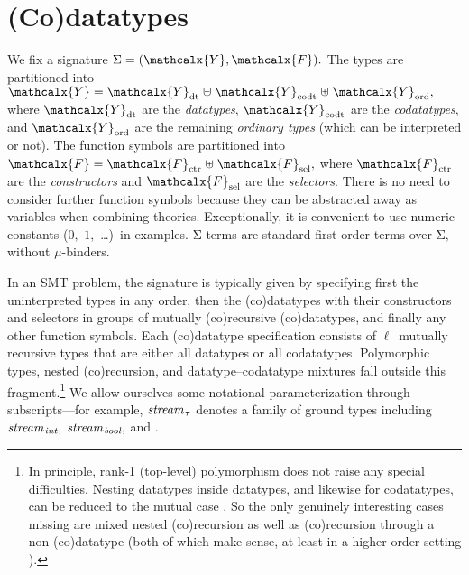 \documentclass[smallcondensed,draft]{svjour3}
\newcommand\Sig{\mathrm{\Sigma}}
\newcommand\ty[1]{\textit{#1}}
\newcommand\Types{\mathcalx{Y}}
\newcommand\Funcs{\mathcalx{F}}
\newcommand\Data{\Types_{\mathrm{dt}}}
\newcommand\Codata{\Types_{\mathrm{codt}}}
\newcommand\Nondata{\Types_{\mathrm{ord}}}
\newcommand\Ctr{\Funcs_{\smash{\mathrm{ctr}}}}
\newcommand\Sel{\Funcs_{\smash{\mathrm{sel}}}}
\newcommand\vthinspace{\kern+0.083333em}
\begin{document}
\section{%
(Co)datatypes}
\label{sec:co-datatypes}


We fix a signature $\Sig = (\Types, \Funcs).$ The types are partitioned into
$\Types = \Data \mathrel{\uplus} \Codata \mathrel{\uplus} \Nondata,$ where $\Data$ are the
\emph{datatypes}, $\Codata$ are the \emph{codatatypes}, and $\Nondata$ are the remaining
\emph{ordinary types} (which can be interpreted or not). The function symbols are
partitioned into $\Funcs = \Ctr \mathrel{\uplus} \Sel,$ where $\Ctr$ are the
\emph{constructors} and $\Sel$ are the \emph{selectors}. There is no need to
consider further function symbols because they can be abstracted away as
variables when combining theories.
Exceptionally, it is convenient to use numeric constants ($0,$ $1,$ \ldots)\ in
examples.
$\Sig$-terms are standard first-order terms
over $\Sig,$
without $\mu$-binders.

In an SMT problem, the signature is typically given by specifying first the
uninterpreted %
types in any order, then the (co)datatypes with their constructors
and selectors in groups of mutually (co)recursive (co)datatypes, and
finally any other function symbols.
%
Each (co)datatype specification consists of $\ell$~mutually recursive types that are
either all datatypes or all codatatypes. Polymorphic types, nested
(co)recursion, and datatype--codatatype mixtures
fall outside this fragment.\footnote{In principle, rank-1 (top-level) polymorphism \cite{blanchette-paskevich-2013}
does not raise any special difficulties. Nesting datatypes inside datatypes,
and likewise for codatatypes, can be reduced to the mutual case
\cite{gunter-1993-not}. So the only genuinely interesting cases missing are
mixed nested (co)recursion as well as
(co)recursion through a non-(co)datatype (both of which make sense,
at least in a higher-order setting \cite{blanchette-et-al-2014-impl}).}
We allow ourselves some notational parameterization
through subscripts---for example, $\ty{stream}_{\vthinspace\tau}$ denotes a
family of ground types including
$\ty{stream}_{\vthinspace\ty{int}},$ $\ty{stream}_{\vthinspace\ty{bool}},$
and \smash{$\ty{stream}_{\vthinspace\ty{stream}_{\vthinspace\ty{real}}}$}.
\end{document}
